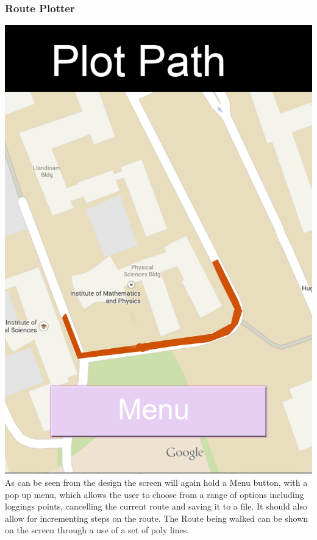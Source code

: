 \subsubsection{Route Plotter}
\includegraphics[scale=0.6]{Design/Plot.png}\\
As can be seen from the design the screen will again hold a Menu button, with a pop up menu, which allows the user to choose from a range of options including loggings points, cancelling the current route and saving it to a file. It should also allow for incrementing steps on the route. The Route being walked can be shown on the screen through a use of a set of poly lines.
